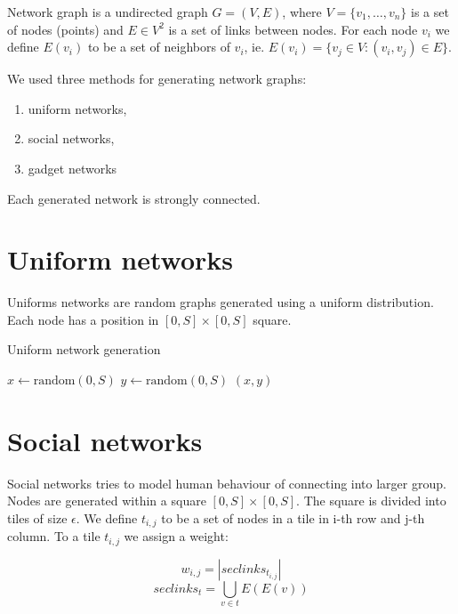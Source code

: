 \documentclass[a4paper,12pt]{report}
\begin{document}
Network graph is a undirected graph $G = (V, E)$, where $V = \{v_1, \ldots, v_n\}$ is a set of nodes (points) and $E \in V^2$ is a set of links between nodes. For each node $v_i$ we define $E(v_i)$ to be a set of neighbors of $v_i$, ie. $E(v_i) = \{ v_j \in V : (v_i, v_j) \in E\}$.

We used three methods for generating network graphs:
\begin{enumerate}
\item uniform networks,
\item social networks,
\item gadget networks
\end{enumerate}

\noindent Each generated network is strongly connected.

\section{Uniform networks}

Uniforms networks are random graphs generated using a uniform distribution. Each node has a position in $[0, S] \times [0, S]$ square.

\begin{algorithm}
\caption{Uniform network generation}
\label{a:uniform}
\begin{algorithmic}
	\State $x \gets \text{random}(0, S)$
	\State $y \gets \text{random}(0, S)$
	\State \Return $(x, y)$
\EndFunction
\end{algorithmic}
\end{algorithm}

\section{Social networks}

Social networks tries to model human behaviour of connecting into larger group. Nodes are generated within a square $[0, S] \times [0, S]$. The square is divided into tiles of size $\epsilon$. We define $t_{i,j}$ to be a set of nodes in a tile in i-th row and j-th column. To a tile $t_{i,j}$ we assign a weight:

\begin{equation*}
w_{i,j} = \left|seclinks_{t_{i,j}} \right|
\end{equation*}
\begin{equation*}
seclinks_t =  \bigcup_{v \in t} E(E(v))
\end{equation*}
\end{document}
